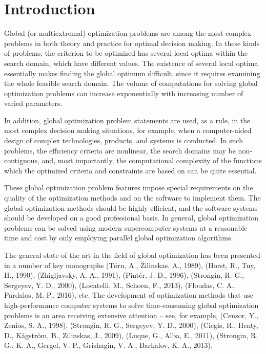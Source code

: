 \documentclass{gOMS2e}
\theoremstyle{plain}%
\theoremstyle{definition}
\theoremstyle{remark}
\begin{document}
\section{Introduction}
\label{sec:intro}
Global (or multiextremal) optimization problems are among the most complex problems
in both theory and practice for optimal decision making. In these kinds of problems,
the criterion to be optimized has several local optima within the search domain,
which have different values. The existence of several local optima essentially makes
finding the global optimum difficult, since it requires examining the whole feasible
search domain. The volume of computations for solving global optimization problems
can increase exponentially with increasing number of varied parameters.
\par
In addition, global optimization problem statements are used, as a rule, in the most
complex decision making situations, for example, when a computer-aided design of complex
technologies, products, and systems is conducted. In such problems, the efficiency
criteria are nonlinear, the search domains may be non-contiguous, and, most importantly,
the computational complexity of the functions which the optimized criteria and constraints
are based on can be quite essential.
\par
These global optimization problem features impose special requirements on the quality of
the optimization methods and on the software to implement them. The global optimization
methods should be highly efficient, and the software systems should be developed on a good
professional basis. In general, global optimization problems can be solved using modern
supercomputer systems at a reasonable time and cost by only employing parallel
global optimization algorithms.
\par
The general state of the art in the field of global optimization has been presented in a
number of key monographs (Törn, A., Žilinskas, A., 1989), (Horst, R., Tuy, H., 1990), (Zhigljavsky, A. A., 1991), (Pintér, J. D., 1996), (Strongin, R. G., Sergeyev, Y. D., 2000), (Locatelli, M., Schoen, F., 2013), (Floudas, C. A., Pardalos, M. P., 2016), etc.
The development of optimization methods that use high-performance computer systems to
solve time-consuming global optimization problems is an area receiving extensive
attention – see, for example, (Censor, Y., Zenios, S. A., 1998), (Strongin, R. G., Sergeyev, Y. D., 2000), (Ciegis, R., Henty, D., Kågström, B., Zilinskas, J., 2009), (Luque, G., Alba, E., 2011), (Strongin, R. G., K. A., Gergel, V. P., Grishagin, V. A., Barkalov, K. A.,  2013).
\end{document}
